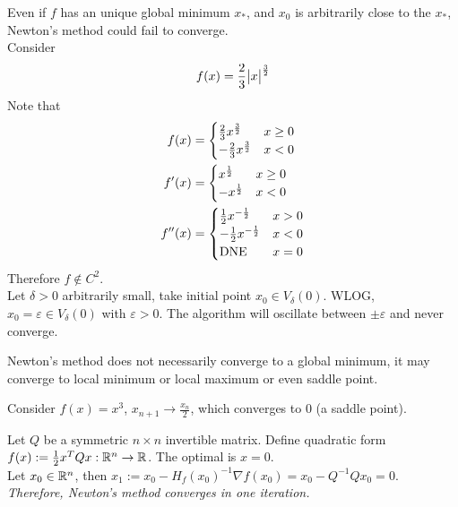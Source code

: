 \documentclass{article}
\begin{document}
	\begin{example}
		Even if $f$ has an unique global minimum $x_*$, and $x_0$ is arbitrarily close to the $x_*$, Newton's method could fail to converge. \\
		Consider
		\begin{align}
			f(x) = \frac{2}{3} \big \vert {x} \big \vert^{\frac{3}{2}}
		\end{align}
		Note that
		\begin{align}
			f(x)&=\begin{cases}{\frac{2}{3} x^{\frac{3}{2}}} & {x \geq 0} \\ {-\frac{2}{3} x^{\frac{3}{2}}} & {x<0}\end{cases} \\
			f'(x) &= \begin{cases}
				x^{\frac{1}{2}} & x \geq 0 \\
				- x^{\frac{1}{2}} & x < 0
			\end{cases} \\
			f''(x) &= \begin{cases}
				\frac{1}{2}x^{-\frac{1}{2}} & x > 0 \\
				- \frac{1}{2}x^{-\frac{1}{2}} & x < 0 \\
				\text{{DNE}} & x = 0
			\end{cases}
		\end{align}
		Therefore $f \notin C^2$. \\
		Let $\delta > 0$ arbitrarily small, take initial point $x_0 \in V_\delta(0)$. WLOG, $x_0 = \varepsilon \in V_\delta(0)$ with $\varepsilon > 0$. The algorithm will oscillate between $\pm \varepsilon$ and never converge.
	\end{example}
	
	\begin{remark}
		Newton's method does not necessarily converge to a global minimum, it may converge to local minimum or local maximum or even saddle point.
	\end{remark}
	
	\begin{example}
		Consider $f(x) = x^3$, $x_{n+1} \to \frac{x_n}{2}$, which converges to 0 (a saddle point).
	\end{example}
	
	\begin{example}
		Let $Q$ be a symmetric $n \times n$ invertible matrix. Define quadratic form $f(x) := \frac{1}{2}x^T Q x: \mathbb{R}^n \to \mathbb{R}$. The optimal is $x = 0$. \\
		Let $x_0 \in \mathbb{R}^n$, then $x_1 := x_0 - H_f(x_0)^{-1} \nabla f(x_0) = x_0 - Q^{-1}Qx_0 = 0$. \emph{Therefore, Newton's method converges in one iteration.} 
	\end{example}
	
\end{document}
